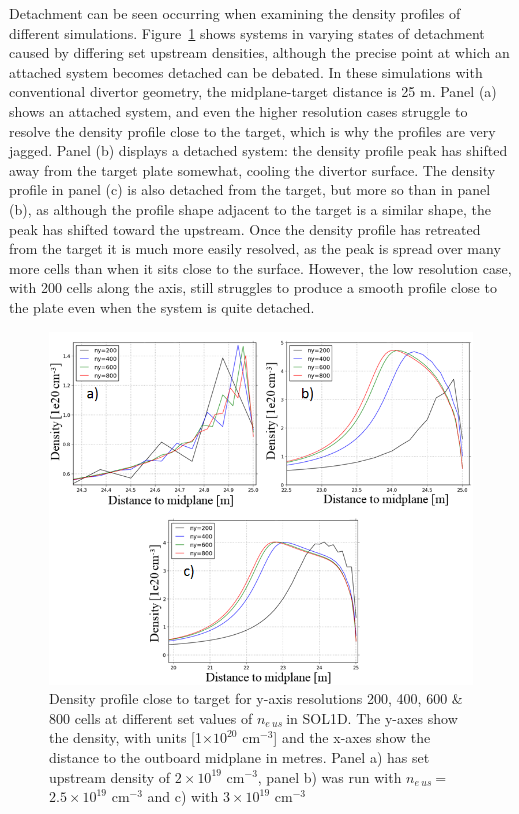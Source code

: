 \documentclass[12pt]{article}  %
\providecommand{\e}[1]{\ensuremath{\times 10^{#1}}} %
\providecommand{\noNe}[1]{{${#1}\times 10^{19}$ cm$^{-3}$}} %
\providecommand{\pow}[1]{{$^{#1}$}} %
\providecommand{\neus}{$n_{e~us}~$} %
\begin{document}
Detachment can be seen occurring when examining the density profiles of different simulations. Figure~\ref{figneprofneusALLtriang} shows systems in varying states of detachment caused by differing set upstream densities, although the precise point at which an attached system becomes detached can be debated. In these simulations with conventional divertor geometry, the midplane-target distance is 25 m. Panel (a) shows an attached system, and even the higher resolution cases struggle to resolve the density profile close to the target, which is why the profiles are very jagged. Panel (b) displays a detached system: the density profile peak has shifted away from the target plate somewhat, cooling the divertor surface. The density profile in panel (c) is also detached from the target, but more so than in panel (b), as although the profile shape adjacent to the target is a similar shape, the peak has shifted toward the upstream. Once the density profile has retreated from the target it is much more easily resolved, as the peak is spread over many more cells than when it sits close to the surface. However, the low resolution case, with 200 cells along the axis, still struggles to produce a smooth profile close to the plate even when the system is quite detached. 

\begin{figure}[h]
\includegraphics[scale=0.8]{Figures/sol1d/neprofneusALLtrianged.png}
\centering
\caption{Density profile close to target for y-axis resolutions 200, 400, 600 \& 800 cells at different set values of \neus in SOL1D. The y-axes show the density, with units [1\e{20} cm\pow{-3}] and the x-axes show the distance to the outboard midplane in metres. Panel a) has set upstream density of \noNe{2}, panel b) was run with \neus = \noNe{2.5} and c) with \noNe{3}}\label{figneprofneusALLtriang}
\end{figure}
\end{document}
